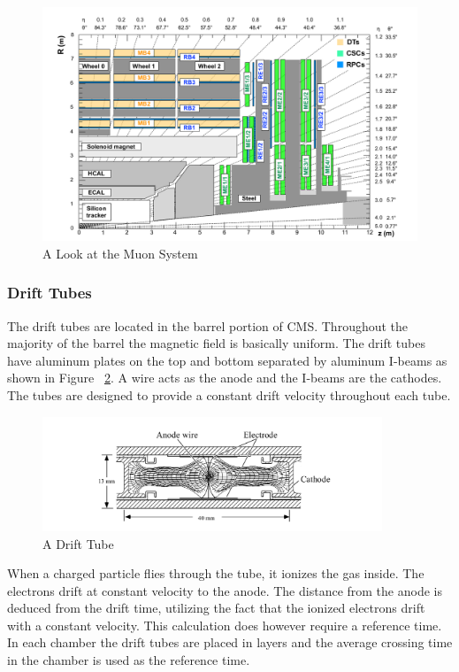 \begin{figure}[h!]
  \centering
  \includegraphics[width=5.5in]{images/muon_system.png}
  \caption
   {A Look at the Muon System \cite{muonsys}}
  \label{fig:muonsysfig}
\end{figure}

\subsubsection{Drift Tubes}

The drift tubes are located in the barrel portion of CMS. Throughout the majority of the barrel the magnetic field is basically uniform. The drift tubes have aluminum plates on the top and bottom separated by aluminum I-beams as shown in Figure ~\ref{fig:dt}. A wire acts as the anode and the I-beams are the cathodes. The tubes are designed to provide a constant drift velocity throughout each tube.
\begin{figure}[h!]
  \centering
  \includegraphics[width=4in]{images/DT.png}
  \caption
   {A Drift Tube \cite{mutdr}}
  \label{fig:dt}
\end{figure}

When a charged particle flies through the tube, it ionizes the gas inside. The electrons drift at constant velocity to the anode. The distance from the anode is deduced from the drift time, utilizing the fact that the ionized electrons drift with a constant velocity. This calculation does however require a reference time. In each chamber the drift tubes are placed in layers and the average crossing time in the chamber is used as the reference time.

